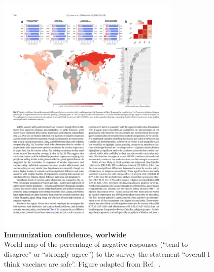 \begin{figure}[H]
	\centering	
	\includegraphics[width=0.8\textwidth, trim={0 0 0 4mm}, clip=true]{Figures/Vaccine/Fig_Larson2016}
	\caption[ Immunization confidence, worlwide]{%
		{\bf Immunization confidence, worlwide}\\
		World map of the percentage of negative responses (``tend to disagree'' or ``strongly agree'') to the survey the statement ``overall I think vaccines are safe''. Figure adapted from Ref.~\cite[]{Larson2016}.}
	\label{fig:Vacc_FigLarson2016}
\end{figure}



